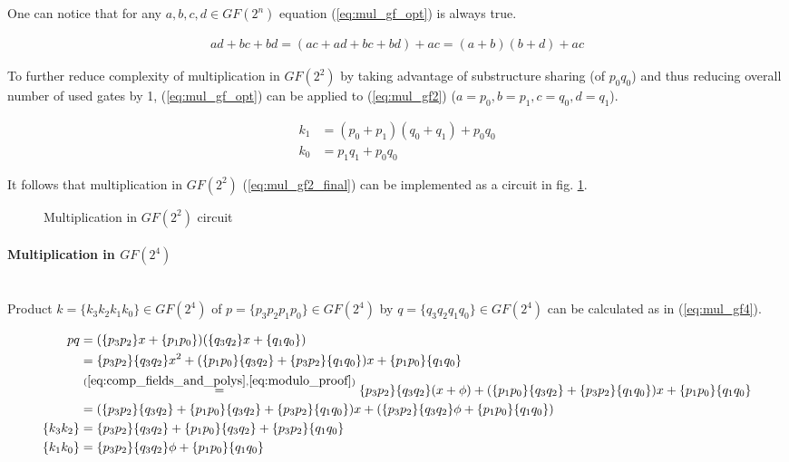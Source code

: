 One can notice that for any $a, b, c, d \in GF(2^n)$ equation (\ref{eq:mul_gf_opt}) is always true.

\begin{equation}
\label{eq:mul_gf_opt}
\begin{aligned}
ad + bc + bd = (ac + ad + bc + bd) + ac = (a + b)(b + d) + ac
\end{aligned}
\end{equation}

To further reduce complexity of multiplication in $GF(2^2)$ by taking advantage of substructure sharing (of $p_0q_0$) and thus reducing overall number of used gates by 1, (\ref{eq:mul_gf_opt}) can be applied to (\ref{eq:mul_gf2}) ($a = p_0, b = p_1, c = q_0, d = q_1$).

\begin{equation}
\label{eq:mul_gf2_final}
\begin{aligned}
k_1 &= (p_0 + p_1)(q_0 + q_1) + p_0q_0\\
k_0 &= p_1q_1 + p_0q_0
\end{aligned}
\end{equation}


It follows that multiplication in $GF(2^2)$ (\ref{eq:mul_gf2_final}) can be implemented as a circuit in fig. \ref{fig:mul_gf2}.

\begin{figure}[!h]
\label{fig:mul_gf2}
\missingfigure[figwidth=6cm]{}
\caption{Multiplication in $GF(2^2)$ circuit}
\end{figure}



\paragraph{Multiplication in $GF(2^4)$}\mbox{}\\
Product $k = \{k_3k_2k_1k_0\} \in GF(2^4)$ of $p = \{p_3p_2p_1p_0\} \in GF(2^4)$ by $q = \{q_3q_2q_1q_0\} \in GF(2^4)$ can be calculated as in (\ref{eq:mul_gf4}).

\begin{equation}
\label{eq:mul_gf4}
\begin{aligned}
pq &= (\{p_3p_2\}x + \{p_1p_0\})(\{q_3q_2\}x + \{q_1q_0\})\\
&= \{p_3p_2\}\{q_3q_2\}x^2 + (\{p_1p_0\}\{q_3q_2\} + \{p_3p_2\}\{q_1q_0\})x + \{p_1p_0\}\{q_1q_0\} \\
&\stackrel{(\ref{eq:comp_fields_and_polys}, \ref{eq:modulo_proof})}{=}
\{p_3p_2\}\{q_3q_2\}(x + \phi) + (\{p_1p_0\}\{q_3q_2\} + \{p_3p_2\}\{q_1q_0\})x + \{p_1p_0\}\{q_1q_0\} \\
&= (\{p_3p_2\}\{q_3q_2\} + \{p_1p_0\}\{q_3q_2\} + \{p_3p_2\}\{q_1q_0\})x + (\{p_3p_2\}\{q_3q_2\}\phi + \{p_1p_0\}\{q_1q_0\})\\
\{k_3k_2\} &= \{p_3p_2\}\{q_3q_2\} + \{p_1p_0\}\{q_3q_2\} + \{p_3p_2\}\{q_1q_0\}\\
\{k_1k_0\} &= \{p_3p_2\}\{q_3q_2\}\phi + \{p_1p_0\}\{q_1q_0\}
\end{aligned}
\end{equation}

